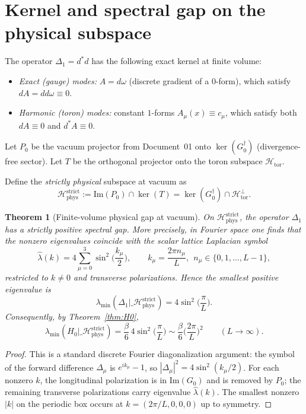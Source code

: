 \documentclass[11pt]{article}
\newtheorem{theorem}{Theorem}
\begin{document}
\section{Kernel and spectral gap on the physical subspace}

The operator $\Delta_1=d^\ast d$ has the following exact kernel at finite volume:
\begin{itemize}[leftmargin=*]
\item \emph{Exact (gauge) modes:} $A=d\omega$ (discrete gradient of a $0$-form), which satisfy $dA=dd\omega\equiv 0$.
\item \emph{Harmonic (toron) modes:} constant $1$-forms $A_\mu(x)\equiv c_\mu$, which satisfy both $dA\equiv 0$ and $d^\ast A\equiv 0$.
\end{itemize}

Let $P_0$ be the vacuum projector from Document~01 onto $\ker(G_0^\dagger)$ (divergence-free sector).  Let $T$ be the orthogonal projector onto the toron subspace $\mathcal H_{\mathrm{tor}}$.

Define the \emph{strictly physical} subspace at vacuum as
\[
\mathcal H_{\mathrm{phys}}^{\mathrm{strict}} := \mathrm{Im}(P_0)\cap \ker(T) = \ker(G_0^\dagger)\cap \mathcal H_{\mathrm{tor}}^\perp .
\]

\begin{theorem}[Finite-volume physical gap at vacuum]\label{thm:gap}
On $\mathcal H_{\mathrm{phys}}^{\mathrm{strict}}$, the operator $\Delta_1$ has a strictly positive spectral gap.
More precisely, in Fourier space one finds that the nonzero eigenvalues coincide with the scalar lattice Laplacian symbol
\[
\hat\lambda(k) = 4\sum_{\mu=0}^3 \sin^2\!\Big(\frac{k_\mu}{2}\Big),
\qquad k_\mu=\frac{2\pi n_\mu}{L},\ \ n_\mu\in\{0,1,\dots,L-1\},
\]
restricted to $k\ne 0$ and transverse polarizations.
Hence the smallest positive eigenvalue is
\[
\lambda_{\min}(\Delta_1|\_{\mathcal H_{\mathrm{phys}}^{\mathrm{strict}}}) = 4\sin^2\!\Big(\frac{\pi}{L}\Big).
\]
Consequently, by Theorem~\ref{thm:H0},
\[
\lambda_{\min}(H_0|\_{\mathcal H_{\mathrm{phys}}^{\mathrm{strict}}})
=\frac{\beta}{6}\,4\sin^2\!\Big(\frac{\pi}{L}\Big)
\sim \frac{\beta}{6}\Big(\frac{2\pi}{L}\Big)^2
\qquad (L\to\infty).
\]
\end{theorem}

\begin{proof}
This is a standard discrete Fourier diagonalization argument:
the symbol of the forward difference $\Delta_\mu$ is $e^{ik_\mu}-1$, so $|\Delta_\mu|^2=4\sin^2(k_\mu/2)$.
For each nonzero $k$, the longitudinal polarization is in $\mathrm{Im}(G_0)$ and is removed by $P_0$; the remaining transverse polarizations carry eigenvalue $\hat\lambda(k)$.
The smallest nonzero $|k|$ on the periodic box occurs at $k=(2\pi/L,0,0,0)$ up to symmetry.
\end{proof}
\end{document}
